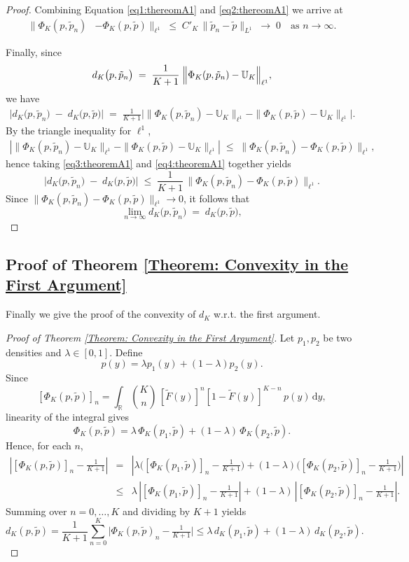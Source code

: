 \documentclass{article}
\begin{document}
\begin{proof}
Combining Equation \ref{eq1:thereomA1} and \ref{eq2:thereomA1} we arrive at
\begin{align*}
\|\Phi_K(p,\tilde p_n) &- \Phi_K(p,\tilde p)\|_{\ell^1}
\;\le\;
C'_K \,\|\tilde{p}_n - \tilde{p}\|_{L^1}
\;\longrightarrow\;
0
\quad\text{as } n\to\infty.
\end{align*}

Finally, since
\[
d_K\bigl(p,\tilde{p}_n\bigr)
\;=\;
\frac{1}{K+1}
\;\Bigl\|\Phi_K(p,\tilde p_n) - \mathbb{U}_K\Bigr\|_{\ell^1},
\]
we have
\begin{align}\label{eq3:theoremA1}
\bigl|d_K\bigl(p,\tilde{p}_n\bigr) \;-\; d_K\bigl(p,\tilde{p}\bigr)\bigr|
\;=\;
\frac{1}{K+1}
\bigl|
\|\Phi_K(p,\tilde p_n) - \mathbb{U}_K\|_{\ell^1}
-
\|\Phi_K(p,\tilde p)  - \mathbb{U}_K\|_{\ell^1}
\bigr|.
\end{align}
By the triangle inequality for $\ell^1$,
\begin{align}\label{eq4:theoremA1}
\left|
\|\Phi_K(p,\tilde p_n) - \mathbb{U}_K\|_{\ell^1}
-
\|\Phi_K(p,\tilde p)   - \mathbb{U}_K\|_{\ell^1}
\right|
\;\le\;
\|\Phi_K(p,\tilde p_n) - \Phi_K(p,\tilde p)\|_{\ell^1},
\end{align}
hence taking \ref{eq3:theoremA1} and \ref{eq4:theoremA1} together yields
\[
\bigl|d_K\bigl(p,\tilde{p}_n\bigr) \;-\; d_K\bigl(p,\tilde{p}\bigr)\bigr|
\;\le\;
\frac{1}{K+1} \,\|\Phi_K(p,\tilde p_n) - \Phi_K(p,\tilde p)\|_{\ell^1}.
\]
Since $\|\Phi_K(p,\tilde p_n) - \Phi_K(p,\tilde p)\|_{\ell^1} \to 0$, it follows that
\[
\lim_{n\to\infty} d_K\bigl(p,\tilde{p}_n\bigr)
\;=\;
d_K\bigl(p,\tilde{p}\bigr),
\]
\end{proof}

\subsection{Proof of Theorem \ref{Theorem: Convexity in the First Argument}}
Finally we give the proof of the convexity of $d_{K}$ w.r.t. the first argument.

\begin{proof}[Proof of Theorem \ref{Theorem: Convexity in the First Argument}]
Let \(p_1,p_2\) be two densities and \(\lambda\in[0,1]\).  Define
\[
p(y)=\lambda p_1(y)+(1-\lambda)p_2(y).
\]
Since
\[
[\Phi_K(p,\tilde p)]_n
=\int_{\mathbb{R}}\binom{K}{n}\,[\tilde F(y)]^n[1-\tilde F(y)]^{K-n}\,p(y)\,\mathrm{d} y,
\]
linearity of the integral gives
\[
\Phi_K(p,\tilde p)
=\lambda\,\Phi_K(p_1,\tilde p)+(1-\lambda)\,\Phi_K(p_2,\tilde p).
\]
Hence, for each \(n\),
\begin{eqnarray*}
\left|[\Phi_K(p,\tilde p)]_n-\tfrac1{K+1}\right|
&=&\left|\lambda\bigl([\Phi_K(p_1,\tilde p)]_n-\tfrac1{K+1}\bigr)
+(1-\lambda)\bigl([\Phi_K(p_2,\tilde p)]_n-\tfrac1{K+1}\bigr)\right|\\
&\le&\lambda\,\left|[\Phi_K(p_1,\tilde p)]_n-\tfrac1{K+1}\right|
+(1-\lambda)\,\left|[\Phi_K(p_2,\tilde p)]_n-\tfrac1{K+1}\right|.
\end{eqnarray*}
Summing over \(n=0,\dots,K\) and dividing by \(K+1\) yields
\[
d_K(p,\tilde p)
=\frac1{K+1}\sum_{n=0}^K\bigl|\Phi_K(p,\tilde p)_n-\tfrac1{K+1}\bigr|
\le\lambda\,d_K(p_1,\tilde p)+(1-\lambda)\,d_K(p_2,\tilde p).
\] 
\end{proof}
\end{document}
